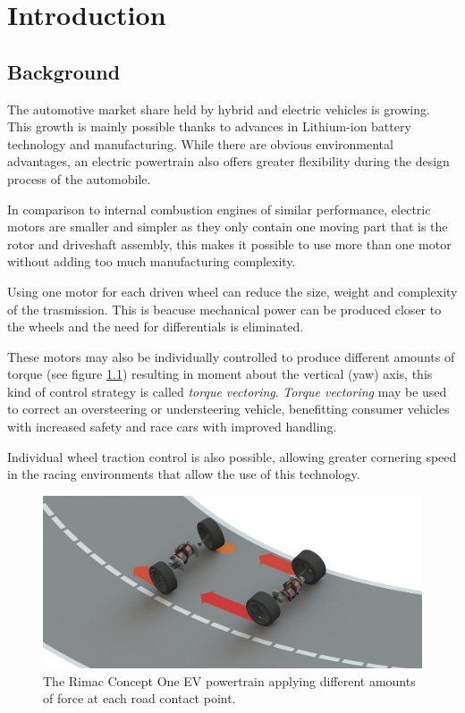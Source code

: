 \chapter{Introduction}
\label{chap:intro}
\section{Background}
\label{sec:background}
The automotive market share held by hybrid and electric vehicles is growing.
This growth is mainly possible thanks to advances in Lithium-ion battery technology and manufacturing\cite{lithium}.
While there are obvious environmental advantages, an electric powertrain also offers greater flexibility during the design process of the automobile.

In comparison to internal combustion engines of similar performance, electric motors are smaller and simpler as they only contain one moving part that is the rotor and driveshaft assembly, this makes it possible to use more than one motor without adding too much manufacturing complexity.

Using one motor for each driven wheel can reduce the size, weight and complexity of the trasmission. This is beacuse mechanical power can be produced closer to the wheels and the need for differentials is eliminated.

These motors may also be individually controlled to produce different amounts of torque (see figure \ref{rimac}) resulting in moment about the vertical (yaw) axis, this kind of control strategy is called \textit{torque vectoring}. \textit{Torque vectoring} may be used to correct an oversteering or understeering vehicle, benefitting consumer vehicles with increased safety and race cars with improved handling.

Individual wheel traction control is also possible, allowing greater cornering speed in the racing environments that allow the use of this technology.

\begin{figure}[tb]
  \centering
  \includegraphics[width=\textwidth]{images/rimac.jpg}
  \caption{The Rimac Concept One EV powertrain applying different amounts of force at each road contact point.}
  \label{rimac}
\end{figure}

